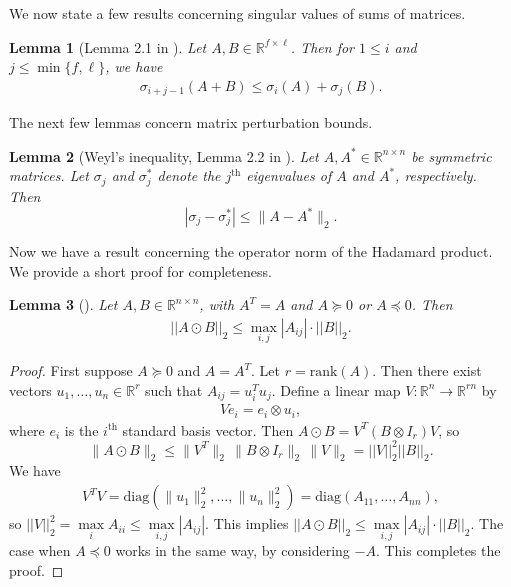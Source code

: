 \documentclass{article}
\newtheorem{lemma}{Lemma}
\newcommand{\real}{\mathbb{R}}
\begin{document}
We now state a few results concerning singular values of sums of matrices.

\begin{lemma}[Lemma 2.1 in \cite{SinSte21}]
\label{lemma:l2.1SinSte}
Let $A, B \in \mathbb{R}^{f \times \ell}$. Then for $1 \leq i$ and $j \leq \min\{f, \ell\}$, we have 
\begin{align*}
\sigma_{i + j - 1}(A + B) \leq \sigma_i(A) + \sigma_j(B).
\end{align*}
\end{lemma}

The next few lemmas concern matrix perturbation bounds.

\begin{lemma}[Weyl's inequality, Lemma 2.2 in \cite{LiaEtal24}]
\label{LemWeyl}
Let $A, A^* \in \real^{n \times n}$ be symmetric matrices. Let $\sigma_j$ and $\sigma_j^*$ denote the $j^{\text{th}}$ eigenvalues of $A$ and $A^*$, respectively. Then
\begin{equation*}
|\sigma_j - \sigma_j^*| \le \|A - A^*\|_2.
\end{equation*}
\end{lemma}

Now we have a result concerning the operator norm of the Hadamard product. We provide a short proof for completeness.

\begin{lemma}[\cite{johnson1990matrix}]
\label{lemma:Oper_Hadam}
Let $A, B \in \mathbb{R}^{n \times n}$, with $A^T = A$ and $A \succeq 0$ or $A \preceq 0$. Then
\begin{align*}
    ||A \odot B||_2 \leq \mathop{\max}\limits_{i, j}|A_{ij}|\cdot||B||_2.
\end{align*}
\end{lemma}

\begin{proof}
First suppose $A\succeq 0$ and $A = A^T$. Let $r = \text{rank}(A)$. Then there exist vectors
$u_1,\dots,u_n\in \mathbb{R}^r$ such that $A_{ij} = u_i^Tu_j$. Define a linear map $V:\mathbb{R}^n \rightarrow \mathbb{R}^{rn}$ by
\begin{align*}
Ve_i = e_i\otimes u_i,
\end{align*}
where $e_i$ is the $i^{\text{th}}$ standard basis vector. Then $A\odot B=V^T(B\otimes I_r)V$, so
\begin{equation*}
\|A\odot B\|_2 \leq \|V^T\|_2\,\|B\otimes I_r\|_2\,\|V\|_2 = ||V||_2^2||B||_2.
\end{equation*}
We have
\begin{align*}
V^TV = \mathrm{diag}(\|u_1\|_2^2,\dots,\|u_n\|_2^2)
= \mathrm{diag}(A_{11},\dots,A_{nn}),    
\end{align*}
so $||V||_2^2 = \mathop{\max}\limits_{i} A_{ii} \leq \mathop{\max}\limits_{i, j}|A_{ij}|$. This implies $||A \odot B||_2 \leq \mathop{\max}\limits_{i, j}|A_{ij}|\cdot||B||_2$. The case when $A \preceq 0$ works in the same way, by considering $-A$. This completes the proof.
\end{proof}
\end{document}
